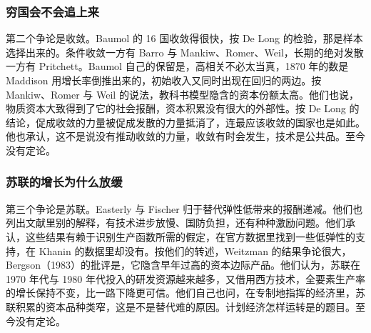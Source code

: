 \subsubsection{穷国会不会追上来}

第二个争论是收敛。Baumol 的 16 国收敛得很快，按 De Long 的检验，那是样本选择出来的。条件收敛一方有 Barro 与 Mankiw、Romer、Weil，长期的绝对发散一方有 Pritchett。Baumol 自己的保留是，高相关不必太当真，1870 年的数是 Maddison 用增长率倒推出来的，初始收入又同时出现在回归的两边\cite{baumol1986}。按 Mankiw、Romer 与 Weil 的说法，教科书模型隐含的资本份额太高\cite{mrw1990}。他们也说，物质资本大致得到了它的社会报酬，资本积累没有很大的外部性\cite{mrw1990}。按 De Long 的结论，促成收敛的力量被促成发散的力量抵消了，连最应该收敛的国家也是如此\cite{delong1987}。他也承认，这不是说没有推动收敛的力量，收敛有时会发生，技术是公共品\cite{delong1987}。至今没有定论。

\subsubsection{苏联的增长为什么放缓}

第三个争论是苏联。Easterly 与 Fischer 归于替代弹性低带来的报酬递减\cite{ef1995}。他们也列出文献里别的解释，有技术进步放慢、国防负担，还有种种激励问题\cite{ef1995}。他们承认，这些结果有赖于识别生产函数所需的假定，在官方数据里找到一些低弹性的支持，在 Khanin 的数据里却没有\cite{ef1995}。按他们的转述，Weitzman 的结果争论很大，Bergson（1983）的批评是，它隐含早年过高的资本边际产品\cite{ef1995}。他们认为，苏联在 1970 年代与 1980 年代投入的研发资源越来越多，又借用西方技术，全要素生产率的增长保持不变，比一路下降更可信\cite{ef1995}。他们自己也问，在专制地指挥的经济里，苏联积累的资本品种类窄，这是不是替代难的原因\cite{ef1995}。计划经济怎样运转是的题目。至今没有定论。

